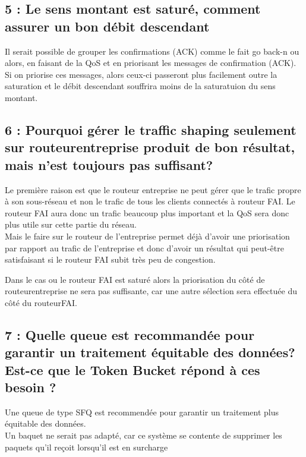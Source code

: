 \documentclass{article}
\begin{document}
\subsection*{5 : Le sens montant est saturé, comment assurer un bon débit descendant}

Il serait possible de grouper les confirmations (ACK) comme le fait go back-n\cite{GoBackN} ou alors, en faisant de la QoS et en priorisant les messages de confirmation (ACK).\\

Si on priorise ces messages, alors ceux-ci passeront plus facilement outre la saturation et le débit descendant souffrira moins de la saturatuion du sens montant.


\subsection*{6 : Pourquoi gérer le traffic shaping seulement sur routeurentreprise produit de bon résultat, mais n'est toujours pas suffisant?}

Le première raison est que le routeur entreprise ne peut gérer que le trafic propre à son sous-réseau et non le trafic de tous les clients connectés à routeur FAI. Le routeur FAI aura donc un trafic beaucoup plus important et la QoS sera donc plus utile sur cette partie du réseau.\\

Mais le faire sur le routeur de l'entreprise permet déjà d'avoir une priorisation par rapport au trafic de l'entreprise et donc d'avoir un résultat qui peut-être satisfaisant si le routeur FAI subit très peu de congestion.

Dans le cas ou le routeur FAI est saturé alors la priorisation du côté de routeurentreprise ne sera pas suffisante, car une autre sélection sera effectuée du côté du routeurFAI.

\subsection*{7 : Quelle queue est recommandée pour garantir un traitement équitable des données? Est-ce que le Token Bucket répond à ces besoin ?}

Une queue de type SFQ \cite{SFQ} est recommendée pour garantir un traitement plus équitable des données.\\

Un baquet ne serait pas adapté, car ce système se contente de supprimer les paquets qu'il reçoit lorsqu'il est en surcharge \cite{Bucket}
\end{document}
